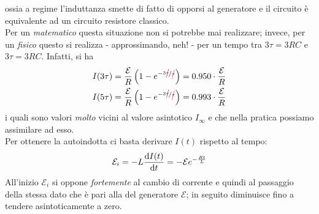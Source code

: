 ossia a regime l'induttanza smette di fatto di opporsi al generatore e il circuito è equivalente ad un circuito resistore classico.\\
Per un \textit{matematico} questa situazione non si potrebbe mai realizzare; invece, per un \textit{fisico} questo si realizza - approssimando, neh! - per un tempo tra $3\tau=3RC$ e $3\tau=3RC$. Infatti, si ha
\begin{align*}
	I(3\tau)&=\frac{\mathcal{E}}{R}\left(1-e^{-\nicefrac{3\Ccancel[red]{\tau}}{\Ccancel[red]{\tau}}}\right)=\num{0.950}\cdot\frac{\mathcal{E}}{R}\\
	I(5\tau)&=\frac{\mathcal{E}}{R}\left(1-e^{-\nicefrac{3\Ccancel[red]{\tau}}{\Ccancel[red]{\tau}}}\right)=\num{0.993}\cdot\frac{\mathcal{E}}{R}
\end{align*}
i quali sono valori \textit{molto} vicini al valore asintotico $I_{\infty}$ e che nella pratica possiamo assimilare ad esso.\\
Per ottenere la \fem autoindotta ci basta derivare $I(t)$ rispetto al tempo:
\begin{equation}
	\mathcal{E}_i=-L\dv{I(t)}{t}=-\mathcal{E}e^{-\frac{Rt}{L}}
\end{equation}
All'inizio $\mathcal{E}_i$ si oppone \textit{fortemente} al cambio di corrente e quindi al passaggio della stessa dato che è pari alla \fem del generatore $\mathcal{E}$; in seguito diminuisce fino a tendere asintoticamente a zero.

